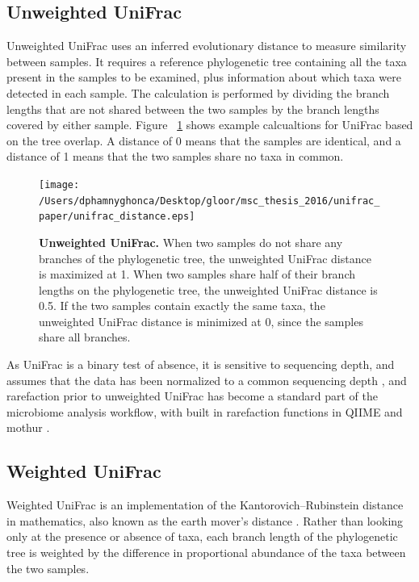 \documentclass[10pt,letterpaper]{article}
\begin{document}
\subsection{Unweighted UniFrac}
Unweighted UniFrac \cite{lozupone2005unifrac} uses an inferred evolutionary distance to measure similarity between samples. It requires a reference phylogenetic tree containing all the taxa present in the samples to be examined, plus information about which taxa were detected in each sample. The calculation is performed by dividing the branch lengths that are not shared between the two samples by the branch lengths covered by either sample. Figure ~\ref{fig1} shows example calcualtions for UniFrac based on the tree overlap. A distance of 0 means that the samples are identical, and a distance of 1 means that the two samples share no taxa in common.

\begin{figure}[h]
\texttt{[image: /Users/dphamnyghonca/Desktop/gloor/msc\_thesis\_2016/unifrac\_paper/unifrac\_distance.eps]}
\caption{{\bf Unweighted UniFrac.}
When two samples do not share any branches of the phylogenetic tree, the unweighted UniFrac distance is maximized at 1. When two samples share half of their branch lengths on the phylogenetic tree, the unweighted UniFrac distance is 0.5. If the two samples contain exactly the same taxa, the unweighted UniFrac distance is minimized at 0, since the samples share all branches.}
\label{fig1}
\end{figure}

As UniFrac is a binary test of absence, it is sensitive to sequencing depth, and assumes that the data has been normalized to a common sequencing depth \cite{lozupone2011unifrac}, and rarefaction prior to unweighted UniFrac has become a standard part of the microbiome analysis workflow, with built in rarefaction functions in QIIME \cite{caporaso2010qiime} and mothur \cite{schloss2009introducing}.

\FloatBarrier

\subsection{Weighted UniFrac}
Weighted UniFrac \cite{lozupone2007quantitative} is an implementation of the Kantorovich–Rubinstein distance in mathematics, also known as the earth mover’s distance \cite{evans2012phylogenetic}. Rather than looking only at the presence or absence of taxa, each branch length of the phylogenetic tree is weighted by the difference in proportional abundance of the taxa between the two samples.
\end{document}
